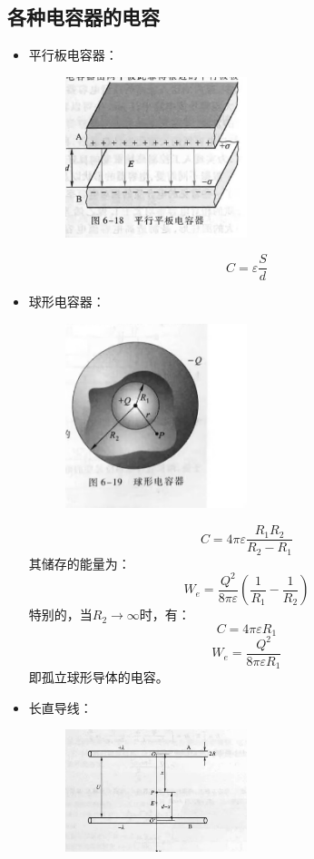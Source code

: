 \documentclass{ctexart}
\begin{document}
\subsection{各种电容器的电容}
\begin{itemize}
    \item 平行板电容器：
    \begin{figure}[H]
        \centering
        \includegraphics[width=0.5\textwidth]{img/6-18.jpg}
    \end{figure}
    $$
        C = \varepsilon \frac{S}{d}
    $$
    \item 球形电容器：
    \begin{figure}[H]
        \centering
        \includegraphics[width=0.5\textwidth]{img/6-19.jpg}
    \end{figure}
    $$
        C = 4\pi \varepsilon \frac{R_1R_2}{R_2 - R_1}
    $$
    其储存的能量为：
    $$
        W_e = \frac{Q^2}{8\pi \varepsilon}\left(\frac{1}{R_1} - \frac{1}{R_2}\right)
    $$
    特别的，当$R_2 \to \infty$时，有：
    $$
        C = 4\pi \varepsilon R_1
    $$
    $$
        W_e = \frac{Q^2}{8\pi \varepsilon R_1}
    $$
    即孤立球形导体的电容。
    \item 长直导线：
    \begin{figure}[H]
        \centering
        \includegraphics[width=0.5\textwidth]{img/6-20.jpg}

\end{figure}
\end{itemize}
\end{document}
